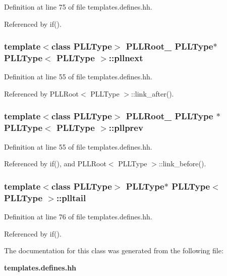 Definition at line 75 of file templates.defines.hh.

Referenced by if().
\subsubsection{\setlength{\rightskip}{0pt plus 5cm}template$<$class PLLType$>$ PLLRoot\_\- PLLType$\ast$ PLLType$<$ PLLType $>$::pllnext\hspace{0.3cm}{\tt  [protected]}}\label{classPLLType_n0}




Definition at line 55 of file templates.defines.hh.

Referenced by PLLRoot$<$ PLLType $>$::link\_\-after().
\subsubsection{\setlength{\rightskip}{0pt plus 5cm}template$<$class PLLType$>$ PLLRoot\_\- PLLType $\ast$ PLLType$<$ PLLType $>$::pllprev\hspace{0.3cm}{\tt  [protected]}}\label{classPLLType_n1}




Definition at line 55 of file templates.defines.hh.

Referenced by if(), and PLLRoot$<$ PLLType $>$::link\_\-before().
\subsubsection{\setlength{\rightskip}{0pt plus 5cm}template$<$class PLLType$>$ PLLType$\ast$ PLLType$<$ PLLType $>$::plltail\hspace{0.3cm}{\tt  [protected]}}\label{classPLLType_n3}




Definition at line 76 of file templates.defines.hh.

Referenced by if().

The documentation for this class was generated from the following file:\begin{CompactItemize}
\item 
{\bf templates.defines.hh}\end{CompactItemize}
